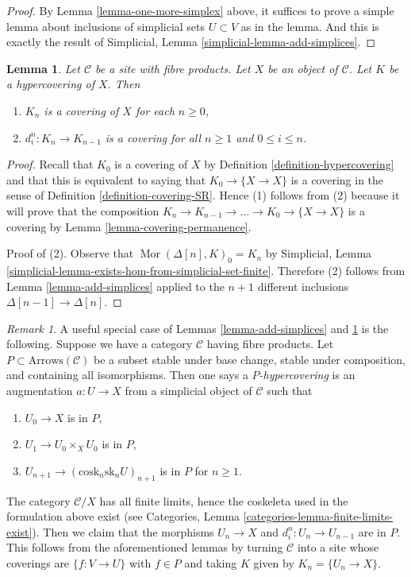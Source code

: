 \documentclass{stacks-project}
\theoremstyle{plain}
\newtheorem{lemma}[subsection]{Lemma}
\theoremstyle{definition}
\theoremstyle{remark}
\newtheorem{remark}[subsection]{Remark}
\numberwithin{equation}{subsection}
\def\Mor{\mathop{\mathrm{Mor}}\nolimits}
\begin{document}
\begin{proof}
By Lemma \ref{lemma-one-more-simplex}
above, it suffices to prove a simple lemma
about inclusions of simplicial sets $U \subset V$ as in the
lemma. And this is exactly the result of
Simplicial, Lemma \ref{simplicial-lemma-add-simplices}.
\end{proof}

\begin{lemma}
\label{lemma-degeneracy-maps-coverings}
Let $\mathcal{C}$ be a site with fibre products. Let $X$ be an object of
$\mathcal{C}$. Let $K$ be a hypercovering of $X$. Then
\begin{enumerate}
\item $K_n$ is a covering of $X$ for each $n \geq 0$,
\item $d^n_i : K_n \to K_{n - 1}$ is a covering for all $n \geq 1$
and $0 \leq i \leq n$.
\end{enumerate}
\end{lemma}

\begin{proof}
Recall that $K_0$ is a covering of $X$ by
Definition \ref{definition-hypercovering}
and that this is equivalent to saying that
$K_0 \to \{X \to X\}$ is a covering in the sense
of Definition \ref{definition-covering-SR}.
Hence (1) follows from (2) because it will prove that
the composition
$K_n \to K_{n - 1} \to \ldots \to K_0 \to \{X \to X\}$
is a covering by Lemma \ref{lemma-covering-permanence}.

\medskip\noindent
Proof of (2). Observe that
$\Mor(\Delta[n], K)_0 = K_n$ by
Simplicial, Lemma \ref{simplicial-lemma-exists-hom-from-simplicial-set-finite}.
Therefore (2) follows from Lemma \ref{lemma-add-simplices}
applied to the $n + 1$ different inclusions $\Delta[n - 1] \to \Delta[n]$.
\end{proof}

\begin{remark}
\label{remark-P-covering}
A useful special case of Lemmas \ref{lemma-add-simplices} and
\ref{lemma-degeneracy-maps-coverings} is the following.
Suppose we have a category $\mathcal{C}$ having fibre products.
Let $P \subset \text{Arrows}(\mathcal{C})$ be a subset
stable under base change, stable under composition,
and containing all isomorphisms. Then one says a
{\it $P$-hypercovering} is an augmentation $a : U \to X$
from a simplicial object of $\mathcal{C}$ such that
\begin{enumerate}
\item $U_0 \to X$ is in $P$,
\item $U_1 \to U_0 \times_X U_0$ is in $P$,
\item $U_{n + 1} \to (\text{cosk}_n\text{sk}_n U)_{n + 1}$
is in $P$ for $n \geq 1$.
\end{enumerate}
The category $\mathcal{C}/X$ has all finite limits, hence the
coskeleta used in the formulation above exist
(see Categories, Lemma \ref{categories-lemma-finite-limits-exist}).
Then we claim that the morphisms $U_n \to X$ and $d^n_i : U_n \to U_{n - 1}$
are in $P$. This follows from the aforementioned
lemmas by turning $\mathcal{C}$ into a site whose coverings
are $\{f : V \to U\}$ with $f \in P$ and taking $K$ given by
$K_n = \{U_n \to X\}$.
\end{remark}
\end{document}
